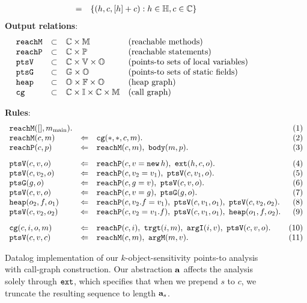 \begin{figure*}
\begin{minipage}{3.7in}
\[\begin{array}{lcll}
          & =     & \multicolumn{2}{l}{\{ (h, c, [h]+c) : h\in\H, c\in\C \}} \\
\end{array}
\]
{\bf Output relations}: \\
\[ \begin{array}{lcll}
\text{\tt reachM}   &\subset& {\mathbb C} \times {\mathbb M} & \text{(reachable methods)} \\
\text{\tt reachP}   &\subset& {\mathbb C} \times {\mathbb P} & \text{(reachable statements)} \\
\text{\tt ptsV}     &\subset& {\mathbb C} \times {\mathbb V} \times {\mathbb O} & \text{(points-to sets of local variables)} \\
\text{\tt ptsG}     &\subset& {\mathbb G} \times {\mathbb O} & \text{(points-to sets of static fields)} \\
\text{\tt heap}     &\subset& {\mathbb O} \times {\mathbb F} \times {\mathbb O} & \text{(heap graph)} \\
\text{\tt cg}       &\subset& {\mathbb C} \times {\mathbb I} \times {\mathbb C} \times {\mathbb M} & \text{(call graph)}
\end{array}
\]
\end{minipage}
{\bf Rules}: \\
\[
\begin{array}{lclr}
\reachM([],\mmain). &           &  & (1) \\
\reachM(c,m)              &\dlogUpdate& \cg(*,*,c,m). & (2) \\
\reachP(c,p)              &\dlogUpdate& \reachM(c,m),\ \body(m,p). & (3)
\\[8pt]
\ptsV(c,v,o)              &\dlogUpdate& \reachP(c, v = \new\,h),\ \ext(h, c, o). & (4) \\
\ptsV(c,v_2,o)            &\dlogUpdate& \reachP(c, v_2 = v_1),\ \ptsV(c,v_1,o). & (5) \\
\ptsG(g,o)                &\dlogUpdate& \reachP(c, g = v),\ \ptsV(c,v,o). & (6) \\
\ptsV(c,v,o)              &\dlogUpdate& \reachP(c, v = g),\ \ptsG(g,o). & (7) \\
\heap(o_2,f,o_1)          &\dlogUpdate& \reachP(c, v_2.f = v_1),\ \ptsV(c,v_1,o_1),\ \ptsV(c,v_2,o_2). & (8) \\
\ptsV(c,v_2,o_2)          &\dlogUpdate& \reachP(c, v_2 = v_1.f),\ \ptsV(c,v_1,o_1),\ \heap(o_1,f,o_2). & (9)
\\[8pt]
\cg(c,i,o,m)            &\dlogUpdate& \reachP(c,i),\ \trgt(i,m),\ \argI(i,v),\ \ptsV(c,v,o). & (10) \\
\ptsV(c,v,c)             &\dlogUpdate& \reachM(c,m),\ \argM(m,v). & (11)
\end{array}
\]
\caption{Datalog implementation of our $k$-object-sensitivity points-to analysis with call-graph construction.
Our abstraction $\mathbf{a}$ affects the analysis solely through $\text{\tt ext}$,
which specifies that when we prepend $s$ to $c$, we truncate the resulting sequence to length $\mathbf{a}_{s}$.
}
\label{fig:aliasAnalysisRules}
\end{figure*}

